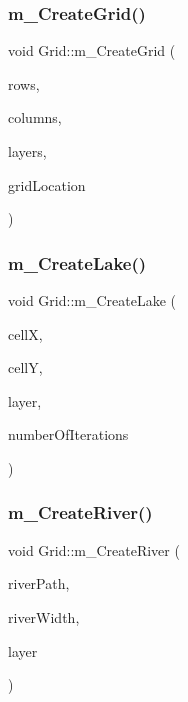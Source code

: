 \subsubsection{\texorpdfstring{m\+\_\+\+Create\+Grid()}{m\_CreateGrid()}}
{\footnotesize\ttfamily void Grid\+::m\+\_\+\+Create\+Grid (\begin{DoxyParamCaption}\item[{unsigned int}]{rows,  }\item[{unsigned int}]{columns,  }\item[{unsigned int}]{layers,  }\item[{sf\+::\+Rectangle\+Shape}]{grid\+Location }\end{DoxyParamCaption})}

\mbox{\label{class_grid_ac97a49844ee993f6afe89ae1518e5f44}} 
\subsubsection{\texorpdfstring{m\+\_\+\+Create\+Lake()}{m\_CreateLake()}}
{\footnotesize\ttfamily void Grid\+::m\+\_\+\+Create\+Lake (\begin{DoxyParamCaption}\item[{int}]{cellX,  }\item[{int}]{cellY,  }\item[{int}]{layer,  }\item[{int}]{number\+Of\+Iterations }\end{DoxyParamCaption})}

\mbox{\label{class_grid_a5e87248bee8835c61b1977407f5ef034}} 
\subsubsection{\texorpdfstring{m\+\_\+\+Create\+River()}{m\_CreateRiver()}}
{\footnotesize\ttfamily void Grid\+::m\+\_\+\+Create\+River (\begin{DoxyParamCaption}\item[{std\+::deque$<$ \mbox{\hyperlink{class_cells}{Cells}} $\ast$$>$}]{river\+Path,  }\item[{int}]{river\+Width,  }\item[{int}]{layer }\end{DoxyParamCaption})}


